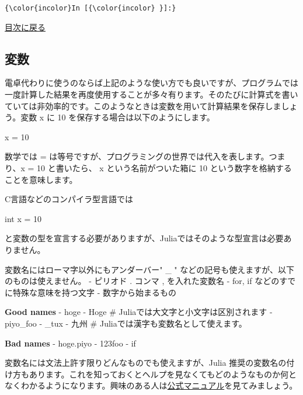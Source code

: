 \documentclass[a4paper,dvipdfmx,uplatex]{jsarticle}
\newenvironment{Shaded}{}{}
\newcommand{\DataTypeTok}[1]{\textcolor[rgb]{0.56,0.13,0.00}{{#1}}}
\newcommand{\DecValTok}[1]{\textcolor[rgb]{0.25,0.63,0.44}{{#1}}}
\newcommand{\FloatTok}[1]{\textcolor[rgb]{0.25,0.63,0.44}{{#1}}}
\newcommand{\NormalTok}[1]{{#1}}
\begin{document}
    \begin{Verbatim}[commandchars=\\\{\}]
{\color{incolor}In [{\color{incolor} }]:} 
\end{Verbatim}

    \protect\hyperlink{ux76eeux6b21}{目次に戻る}

    \subsection{変数}\label{ux5909ux6570}

電卓代わりに使うのならば上記のような使い方でも良いですが、プログラムでは一度計算した結果を再度使用することが多々有ります。そのたびに計算式を書いていては非効率的です。このようなときは変数を用いて計算結果を保存しましょう。変数
x に 10 を保存する場合は以下のようにします。

\begin{Shaded}
\begin{Highlighting}[]
     \NormalTok{x = }\FloatTok{10}
\end{Highlighting}
\end{Shaded}

数学では =
は等号ですが、プログラミングの世界では代入を表します。つまり、x = 10
と書いたら、 x という名前がついた箱に 10
という数字を格納することを意味します。

C言語などのコンパイラ型言語では

\begin{Shaded}
\begin{Highlighting}[]
\DataTypeTok{int} \NormalTok{x = }\DecValTok{10}
\end{Highlighting}
\end{Shaded}

と変数の型を宣言する必要がありますが、Juliaではそのような型宣言は必要ありません。

変数名にはローマ字以外にもアンダーバー" \_ "
などの記号も使えますが、以下のものは使えません。 - ピリオド . コンマ ,
を入れた変数名 - for, if などのすでに特殊な意味を持つ文字 -
数字から始まるもの

\textbf{Good names} - hoge - Hoge \#
Juliaでは大文字と小文字は区別されます - piyo\_foo - \_tux - 九州 \#
Juliaでは漢字も変数名として使えます。

\textbf{Bad names} - hoge.piyo - 123foo - if

変数名には文法上許す限りどんなものでも使えますが、Julia
推奨の変数名の付け方もあります。これを知っておくとヘルプを見なくてもどのようなものか何となくわかるようになります。興味のある人は\href{http://docs.julialang.org/en/latest/manual/variables.html\#Stylistic-Conventions-1}{公式マニュアル}を見てみましょう。
\end{document}
